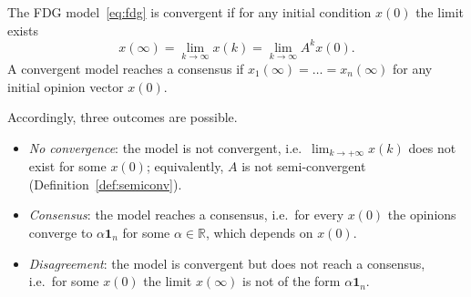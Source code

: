 \begin{definition}
\label{def:convergence}
The FDG model~\eqref{eq:fdg} is convergent if for any initial condition $x(0)$ the limit
exists
\[
  x(\infty) = \lim_{k \to \infty} x(k) = \lim_{k \to \infty} A^k x(0).
\]
A convergent model reaches a consensus if $x_1(\infty) = \dots = x_n(\infty)$ for any
initial opinion vector $x(0)$.
\end{definition}

Accordingly, three outcomes are possible.
\begin{itemize}
  \item \emph{No convergence}: the model is not convergent, i.e.\ $\lim_{k \to +\infty}
        x(k)$ does not exist for some $x(0)$; equivalently, $A$ is not semi-convergent
        (Definition~\ref{def:semiconv}).
  \item \emph{Consensus}: the model reaches a consensus, i.e.\ for every $x(0)$ the
        opinions converge to $\alpha \mathbf{1}_n$ for some $\alpha \in \mathbb{R}$,
        which depends on $x(0)$.
  \item \emph{Disagreement}: the model is convergent but does not reach a consensus,
        i.e.\ for some $x(0)$ the limit $x(\infty)$ is not of the form
        $\alpha \mathbf{1}_n$.
\end{itemize}
